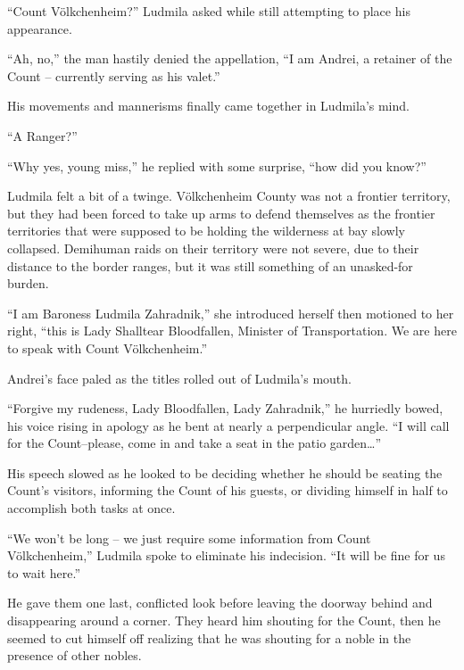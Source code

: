  

“Count Völkchenheim?” Ludmila asked while still attempting to place his appearance.

 

“Ah, no,” the man hastily denied the appellation, “I am Andrei, a retainer of the Count – currently serving as his valet.”

 

His movements and mannerisms finally came together in Ludmila’s mind.

 

“A Ranger?”

 

“Why yes, young miss,” he replied with some surprise, “how did you know?”

 

Ludmila felt a bit of a twinge. Völkchenheim County was not a frontier territory, but they had been forced to take up arms to defend themselves as the frontier territories that were supposed to be holding the wilderness at bay slowly collapsed. Demihuman raids on their territory were not severe, due to their distance to the border ranges, but it was still something of an unasked-for burden.

 

“I am Baroness Ludmila Zahradnik,” she introduced herself then motioned to her right, “this is Lady Shalltear Bloodfallen, Minister of Transportation. We are here to speak with Count Völkchenheim.”

 

Andrei’s face paled as the titles rolled out of Ludmila’s mouth.

 

“Forgive my rudeness, Lady Bloodfallen, Lady Zahradnik,” he hurriedly bowed, his voice rising in apology as he bent at nearly a perpendicular angle. “I will call for the Count–please, come in and take a seat in the patio garden…”

 

His speech slowed as he looked to be deciding whether he should be seating the Count’s visitors, informing the Count of his guests, or dividing himself in half to accomplish both tasks at once.

 

“We won’t be long – we just require some information from Count Völkchenheim,” Ludmila spoke to eliminate his indecision. “It will be fine for us to wait here.”

 

He gave them one last, conflicted look before leaving the doorway behind and disappearing around a corner. They heard him shouting for the Count, then he seemed to cut himself off realizing that he was shouting for a noble in the presence of other nobles.

